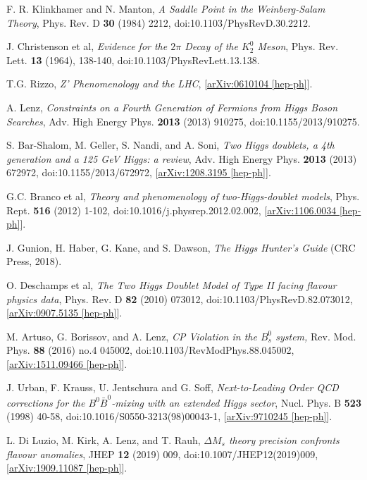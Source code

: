 \documentclass[a4paper,12pt]{article}
\begin{document}
\begin{thebibliography}{99}
F. R. Klinkhamer and N. Manton, \emph{A Saddle Point in the Weinberg-Salam Theory}, Phys. Rev. D \textbf{30} (1984) 2212, doi:10.1103/PhysRevD.30.2212.

J. Christenson et al, \emph{Evidence for the $2\pi$ Decay of the $K_2^0$ Meson}, Phys. Rev. Lett. \textbf{13} (1964), 138-140, doi:10.1103/PhysRevLett.13.138.

T.G. Rizzo, \emph{Z' Phenomenology and the LHC}, [\href{https://arxiv.org/abs/hep-ph/0610104}{arXiv:0610104 [hep-ph]}].

A. Lenz, \emph{Constraints on a Fourth Generation of Fermions from Higgs Boson Searches}, Adv. High Energy Phys. \textbf{2013} (2013) 910275, doi:10.1155/2013/910275.

S. Bar-Shalom, M. Geller, S. Nandi, and A. Soni, \emph{Two Higgs doublets, a 4th generation and a 125 GeV Higgs: a review}, Adv. High Energy Phys. \textbf{2013} (2013) 672972, doi:10.1155/2013/672972, [\href{https://arxiv.org/abs/1208.3195v2}{arXiv:1208.3195 [hep-ph]}].

G.C. Branco et al, \emph{Theory and phenomenology of two-Higgs-doublet models}, Phys. Rept. \textbf{516} (2012) 1-102, doi:10.1016/j.physrep.2012.02.002, [\href{https://arxiv.org/pdf/1106.0034.pdf}{arXiv:1106.0034 [hep-ph]}].

J. Gunion, H. Haber, G. Kane, and S. Dawson, \emph{The Higgs Hunter's Guide} (CRC Press, 2018).

O. Deschamps et al, \emph{The Two Higgs Doublet Model of Type II facing flavour physics data}, Phys. Rev. D \textbf{82} (2010) 073012, doi:10.1103/PhysRevD.82.073012, [\href{https://arxiv.org/abs/0907.5135}{arXiv:0907.5135 [hep-ph]}].

M. Artuso, G. Borissov, and A. Lenz, \emph{CP Violation in the $B_s^0$ system,} Rev. Mod. Phys. \textbf{88} (2016) no.4 045002, doi:10.1103/RevModPhys.88.045002, [\href{https://arxiv.org/abs/1511.09466}{arXiv:1511.09466 [hep-ph]}].

J. Urban, F. Krauss, U. Jentschura and G. Soff, \emph{Next-to-Leading Order QCD corrections for the $B^0\bar{B}^0$-mixing with an extended Higgs sector}, Nucl. Phys. B \textbf{523} (1998) 40-58, doi:10.1016/S0550-3213(98)00043-1, [\href{https://arxiv.org/abs/hep-ph/9710245}{arXiv:9710245 [hep-ph]}].

L. Di Luzio, M. Kirk, A. Lenz, and T. Rauh, \emph{$\Delta M_s$ theory precision confronts flavour anomalies}, JHEP \textbf{12} (2019) 009, doi:10.1007/JHEP12(2019)009, [\href{https://arxiv.org/abs/1909.11087}{arXiv:1909.11087 [hep-ph]}].


\end{thebibliography}
\end{document}
